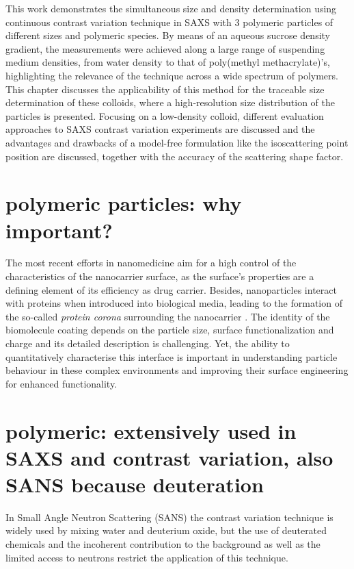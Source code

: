 This work demonstrates the simultaneous size and density determination using continuous contrast variation technique in SAXS with 3 polymeric particles of different sizes and polymeric species. By means of an aqueous sucrose density gradient, the measurements were achieved along a large range of suspending medium densities, from water density to that of poly(methyl methacrylate)'s, highlighting the relevance of the technique across a wide spectrum of polymers. This chapter discusses the applicability of this method for the traceable size determination of these colloids, where a high-resolution size distribution of the particles is presented. Focusing on a low-density colloid, different evaluation approaches to SAXS contrast variation experiments are discussed and the advantages and drawbacks of a model-free formulation like the isoscattering point position are discussed, together with the accuracy of the scattering shape factor.


\section{polymeric particles: why important?}

The most recent efforts in nanomedicine aim for a high control of the characteristics of the nanocarrier surface, as the surface's properties are a defining element of its efficiency as drug carrier. Besides, nanoparticles interact with proteins when introduced into biological media, leading to the formation of the so-called \emph{protein corona} surrounding the nanocarrier \citep{cedervall_understanding_2007,monopoli_physicalchemical_2011,casals_time_2010}. The identity of the biomolecule coating depends on the particle size, surface functionalization and charge \citep{lundqvist_nanoparticle_2008,tenzer_rapid_2013,gessner_functional_2003} and its detailed description is challenging. Yet, the ability to quantitatively characterise this interface is important in understanding particle behaviour in these complex environments and improving their surface engineering for enhanced functionality.

\section{polymeric: extensively used in SAXS and contrast variation, also SANS because deuteration}

In Small Angle Neutron Scattering (SANS) the contrast variation technique is widely used by mixing water and deuterium oxide, but the use of deuterated chemicals and the incoherent contribution to the background as well as the limited access to neutrons restrict the application of this technique.

